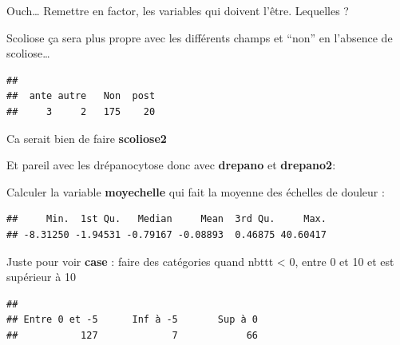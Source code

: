 \documentclass[
]{book}
\newenvironment{Shaded}{\begin{snugshade}}{\end{snugshade}}
\newcommand{\FunctionTok}[1]{\textcolor[rgb]{0.13,0.29,0.53}{\textbf{#1}}}
\newcommand{\NormalTok}[1]{#1}
\newcommand{\OtherTok}[1]{\textcolor[rgb]{0.56,0.35,0.01}{#1}}
\newcommand{\SpecialCharTok}[1]{\textcolor[rgb]{0.81,0.36,0.00}{\textbf{#1}}}
\newcommand{\StringTok}[1]{\textcolor[rgb]{0.31,0.60,0.02}{#1}}
\begin{document}
Ouch\ldots{} Remettre en factor, les variables qui doivent l'être. Lequelles ?

Scoliose ça sera plus propre avec les différents champs et ``non'' en l'absence
de scoliose\ldots{}

\begin{Shaded}
\end{Shaded}

\begin{verbatim}
## 
##  ante autre   Non  post 
##     3     2   175    20
\end{verbatim}

Ca serait bien de faire \textbf{scoliose2}

Et pareil avec les drépanocytose donc avec \textbf{drepano} et \textbf{drepano2}:

Calculer la variable \textbf{moyechelle} qui fait la moyenne des échelles de douleur :

\begin{verbatim}
##     Min.  1st Qu.   Median     Mean  3rd Qu.     Max. 
## -8.31250 -1.94531 -0.79167 -0.08893  0.46875 40.60417
\end{verbatim}

Juste pour voir \textbf{case} : faire des catégories quand nbttt \textless{} 0, entre 0 et 10
et est supérieur à 10

\begin{verbatim}
## 
## Entre 0 et -5      Inf à -5       Sup à 0 
##           127             7            66
\end{verbatim}

  
\end{document}
